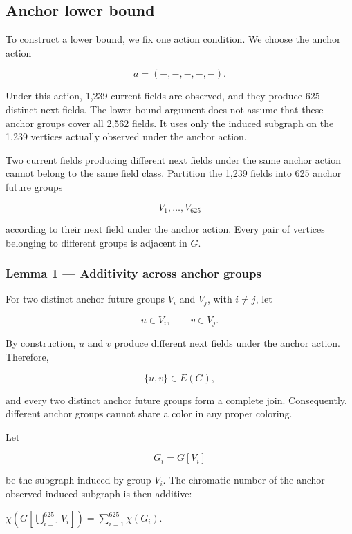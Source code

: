 \documentclass[
  11pt,
]{article}
\begin{document}
\subsection{Anchor lower bound}\label{anchor-lower-bound}

To construct a lower bound, we fix one action condition. We choose the
anchor action

\[{a=(-,-,-,-,-).}\]

Under this action, 1,239 current fields are observed, and they produce
625 distinct next fields. The lower-bound argument does not assume that
these anchor groups cover all 2,562 fields. It uses only the induced
subgraph on the 1,239 vertices actually observed under the anchor
action.

Two current fields producing different next fields under the same anchor
action cannot belong to the same field class. Partition the 1,239 fields
into 625 anchor future groups

\[{V_1,\ldots,V_{625}}\]

according to their next field under the anchor action. Every pair of
vertices belonging to different groups is adjacent in \({G}\).

\hypertarget{lemma-1-additivity-across-anchor-groups}{%
\subsubsection{Lemma 1 --- Additivity across anchor
groups}\label{lemma-1-additivity-across-anchor-groups}}

For two distinct anchor future groups \({V_i}\) and \({V_j}\), with
\({i\neq j}\), let

\[{u\in V_i,\qquad v\in V_j.}\]

By construction, \({u}\) and \({v}\) produce different next fields under
the anchor action. Therefore,

\[{\lbrace u,v\rbrace\in E(G),}\]

and every two distinct anchor future groups form a complete join.
Consequently, different anchor groups cannot share a color in any proper
coloring.

Let

\[{G_i=G[V_i]}\]

be the subgraph induced by group \({V_i}\). The chromatic number of the
anchor-observed induced subgraph is then additive:

\({\chi\!\left(G\!\left[\bigcup_{i=1}^{625}V_i\right]\right) =\sum_{i=1}^{625}\chi(G_i).}\)
\end{document}
